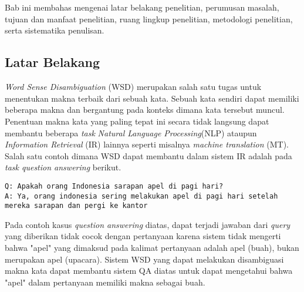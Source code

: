 \chapter{\babSatu}
Bab ini membahas mengenai latar belakang penelitian, perumusan masalah, tujuan dan manfaat penelitian, ruang lingkup penelitian, metodologi penelitian, serta sistematika penulisan.

\section{Latar Belakang}

\textit{Word Sense Disambiguation} (WSD) merupakan salah satu tugas untuk menentukan makna terbaik dari sebuah kata. Sebuah kata sendiri dapat memiliki beberapa makna dan bergantung pada konteks dimana kata tersebut muncul. Penentuan makna kata yang paling tepat ini secara tidak langsung dapat membantu beberapa \textit{task} \textit{Natural Language Processing}(NLP) ataupun \textit{Information Retrieval} (IR) lainnya seperti misalnya \textit{machine translation} (MT). Salah satu contoh dimana WSD dapat membantu dalam sistem IR adalah pada \textit{task question answering} berikut.

\begin{lstlisting}[backgroundcolor = \color{white}]
Q: Apakah orang Indonesia sarapan apel di pagi hari?
A: Ya, orang indonesia sering melakukan apel di pagi hari setelah mereka sarapan dan pergi ke kantor 
\end{lstlisting}
Pada contoh kasus \textit{question answering} diatas, dapat terjadi jawaban dari \textit{query} yang diberikan tidak cocok dengan pertanyaan karena sistem tidak mengerti bahwa "apel" yang dimaksud pada kalimat pertanyaan adalah apel (buah), bukan merupakan apel (upacara). Sistem WSD yang dapat melakukan disambiguasi makna kata dapat membantu sistem QA diatas untuk dapat mengetahui bahwa "apel" dalam pertanyaan memiliki makna sebagai buah.

